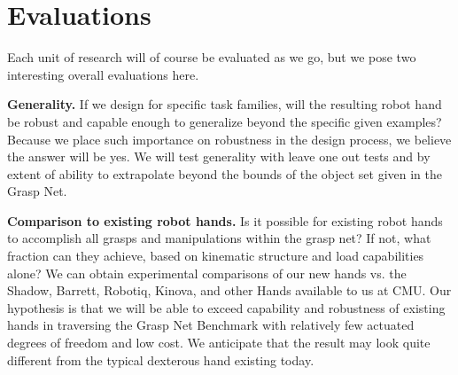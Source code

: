 \section{Evaluations}

Each unit of research will of course be evaluated as we go, but we pose two interesting overall evaluations here.

\smallskip\noindent
{\bf Generality. }  If we design for specific task families, will the resulting robot hand be robust and capable enough to generalize beyond the specific given examples?   Because we place such importance on robustness in the design process, we believe the answer will be yes.   We will test generality with leave one out tests and by extent of ability to extrapolate beyond the bounds of the object set given in the Grasp Net.

\smallskip\noindent
{\bf  Comparison to existing robot hands.}    Is it possible for existing robot hands to accomplish all grasps and manipulations within the grasp net?   If not, what fraction can they achieve, based on kinematic structure and load capabilities alone?    We can obtain experimental comparisons of our new hands vs. the Shadow, Barrett, Robotiq, Kinova, and other Hands available to us at CMU.   Our hypothesis is that we will be able to exceed capability and robustness of existing hands in traversing the Grasp Net Benchmark with relatively few actuated degrees of freedom and low cost.   We anticipate that the result may look quite different from the typical dexterous hand existing today.
